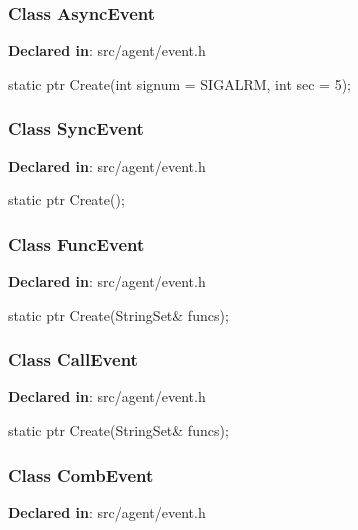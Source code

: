 \subsubsection{Class AsyncEvent}
\textbf{Declared in}: src/agent/event.h

\begin{apient}
static ptr Create(int signum = SIGALRM,
                  int sec = 5);
\end{apient}

\subsubsection{Class SyncEvent}
\textbf{Declared in}: src/agent/event.h

\begin{apient}
static ptr Create();
\end{apient}

\subsubsection{Class FuncEvent}
\textbf{Declared in}: src/agent/event.h

\begin{apient}
static ptr Create(StringSet& funcs);
\end{apient}

\subsubsection{Class CallEvent}
\textbf{Declared in}: src/agent/event.h

\begin{apient}
static ptr Create(StringSet& funcs);
\end{apient}

\subsubsection{Class CombEvent}
\textbf{Declared in}: src/agent/event.h

